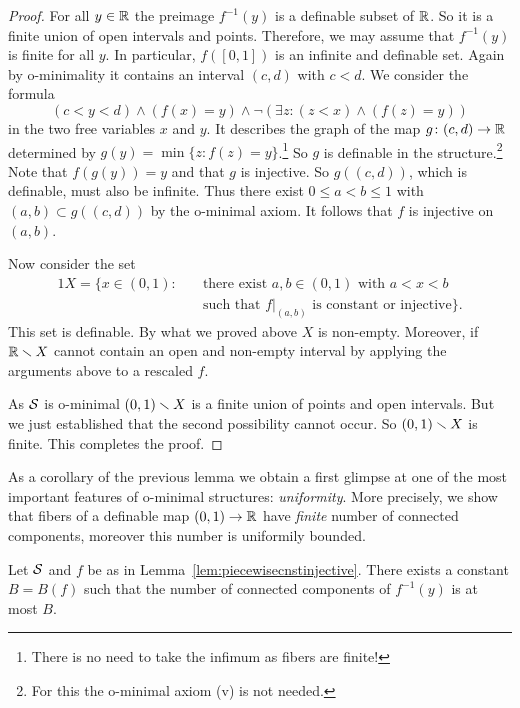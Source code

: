 \begin{proof}
  For all $y\in{\mathbb{R}}$ the preimage $f^{-1}(y)$ is a definable subset of
  ${\mathbb{R}}$. So it is a finite union of open intervals and points.
  Therefore, we may assume that  $f^{-1}(y)$ is finite for all $y$.
  In particular, $f([0,1])$ is an infinite and definable set. Again by
  o-minimality it contains an interval $(c,d)$ with $c<d$.
  We consider the formula 
  \begin{equation*}
    (c<y<d) \wedge (f(x)=y) \wedge \neg (\exists z : (z<x) \wedge (f(z)=y))
  \end{equation*}
  in the two free variables $x$ and $y$. It describes the graph
  of the map $g\colon (c,d)\rightarrow {\mathbb{R}}$ determined by
  $g(y) = \min\{z : f(z)=y\}$.\footnote{There is no need to take the
    infimum as fibers are finite!} So  $g$ is
  definable in the structure.\footnote{For this the o-minimal axiom
    (v) is not needed.} Note that $f(g(y))=y$ and that $g$ is
  injective. So $g((c,d))$, which is definable, must also be infinite.
  Thus there exist $0\le a<b\le 1$ with $(a,b)\subset g((c,d))$ by the
  o-minimal axiom. It follows that $f$ is injective on $(a,b)$.

  Now consider the set
  \begin{alignat*}1
    X=\{ x\in (0,1): \quad &\text{there exist $a,b\in (0,1)$ with $a<x<b$}
    \\ &\text{such
      that
      $f|_{(a,b)}$ is constant or injective}\}. 
  \end{alignat*}
  This set is definable. By what we proved above $X$ is non-empty.
  Moreover, if ${\mathbb{R}}\smallsetminus X$ cannot contain an open and non-empty
  interval by applying the arguments above to a rescaled $f$.
  
  As ${\mathcal S}$ is o-minimal $(0,1)\smallsetminus X$ is a finite union of points and
  open intervals. But we just established that the second possibility
  cannot occur. So $(0,1)\smallsetminus X$ is finite. This completes the proof. 
\end{proof}

As a corollary of the previous lemma we obtain a first glimpse at one
of the most important features of o-minimal structures:
\emph{uniformity}. More precisely, we show that fibers of a definable
map $(0,1)\rightarrow{\mathbb{R}}$ have \emph{finite} number of connected
components, moreover this number is uniformily bounded. 

\begin{corollary}
  Let ${\mathcal S}$ and  $f$ be as in Lemma~\ref{lem:piecewisecnstinjective}.
  There exists a constant $B=B(f)$ such that the number of connected
  components of $f^{-1}(y)$ is at most $B$. 
\end{corollary}

